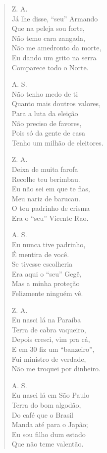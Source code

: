 \begin{verse}
Z. A.\\
Já lhe disse, “seu” Armando\\
Que na peleja sou forte,\\
Não temo cara zangada,\\
Não me amedronto da morte,\\
Eu dando um grito na serra\\
Comparece todo o Norte.

A. S.\\
Não tenho medo de ti\\
Quanto mais doutros valores,\\
Para a luta da eleição\\
Não preciso de favores,\\
Pois só da gente de casa\\
Tenho um milhão de eleitores.

Z. A.\\
Deixa de muita farofa\\
Recolhe teu berimbau.\\
Eu não sei em que te fias,\\
Meu nariz de barucau.\\
O teu padrinho de crisma\\
Era o “seu” Vicente Rao.

A. S.\\
Eu nunca tive padrinho,\\
É mentira de você.\\
Se tivesse escolheria\\
Era aqui o “seu” Gegê,\\
Mas a minha proteção\\
Felizmente ninguém vê.


Z. A.\\
Eu nasci lá na Paraíba\\
Terra de cabra vaqueiro,\\
Depois cresci, vim pra cá,\\
E em 30 fiz um “banzeiro”,\\
Fui ministro de verdade,\\
Não me troquei por dinheiro.

A. S.\\
Eu nasci lá em São Paulo\\
Terra do bom algodão,\\
Do café que o Brasil\\
Manda até para o Japão; \\
Eu sou filho dum estado\\
Que não teme valentão.


\end{verse}
